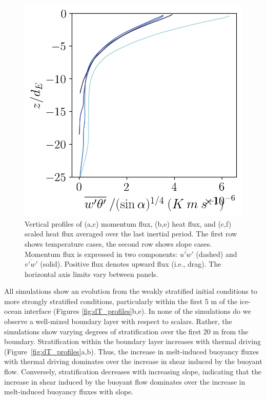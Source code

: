 \documentclass[draft]{styles/agujournal2019}
\begin{document}
\begin{figure}[h!]
\begin{minipage}{0.33\textwidth}
    \end{minipage}%
    \begin{minipage}{0.33\textwidth}
        \includegraphics[trim={0 0 0 0},clip,width=\textwidth]{Figures/heatflux_cmp_dslope_43h_tav13h_slopescale_z_profile.png}
    \end{minipage}
    \caption{Vertical profiles of (a,c) momentum flux, (b,e) heat flux, and (c,f) scaled heat flux averaged over the last inertial period. The first row shows temperature cases, the second row shows slope cases. Momentum flux is expressed in two components:  $\overline{u'w'}$ (dashed) and $\overline{v'w'}$ (solid). Positive flux denotes upward flux (i.e., drag). The horizontal axis limits vary between panels.}
    \label{fig:flux_profiles}
\end{figure}


All simulations show an evolution from the weakly stratified initial conditions to more strongly stratified conditions, particularly within the first 5 m of the ice-ocean interface (Figures \ref{fig:dT_profiles}b,e). In none of the simulations do we observe a well-mixed boundary layer with respect to scalars. Rather, the simulations show varying degrees of stratification over the first 20 m from the boundary. Stratification within the boundary layer increases with thermal driving (Figure~\ref{fig:dT_profiles}a,b). Thus, the increase in melt-induced buoyancy fluxes with thermal driving dominates over the increase in shear induced by the buoyant flow. Conversely, stratification decreases with increasing slope, indicating that the increase in shear induced by the buoyant flow dominates over the increase in melt-induced buoyancy fluxes with slope. 
\end{document}
